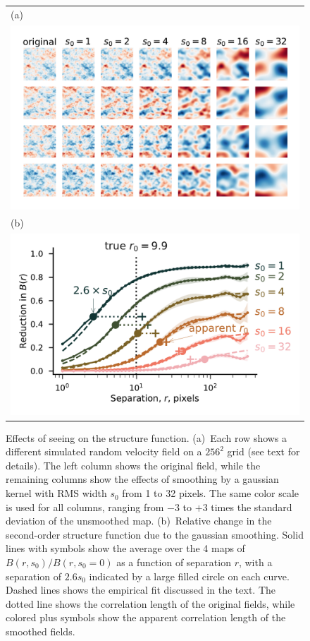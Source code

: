 \documentclass[fleqn,usenatbib, useAMS, a4paper]{mnras}
\newcommand\startNEW{\color{black}}
\newcommand\stopNEW{\color{black}}
\newcommand\NEW[1]{\startNEW #1\stopNEW\relax}
\begin{document}
\begin{figure}
  \begin{tabular}{@{} l @{}}
    (a)\\
    \includegraphics[width=\linewidth]{Figures/fake-3d-seeing-nonp-ems-fluct-thumbnails_sigE_1}\\
    (b)\\
    \includegraphics[width=\linewidth]{Figures/fake-seeing-nonp-3d-ems-fluc_m4-reduction_sigE_1}
  \end{tabular}
  \caption{Effects of seeing on the structure function.
    (a)~Each row shows a different simulated random velocity field
    on a \(256^2\) grid (see text for details).
    The left column shows the original field,
    while the remaining columns show the effects of smoothing by a gaussian kernel
    with RMS width \(s_0\) from 1 to 32 pixels.
    The same color scale is used for all columns, ranging from \(-3\) to \(+3\) times
    the standard deviation of the unsmoothed map.
    (b)~Relative change in the second-order structure function due to the gaussian smoothing.
    Solid lines with symbols show the average over the 4 maps of
    \(B(r, s_0) / B(r, s_0 = 0)\) as a function of separation \(r\),
    with a separation of \NEW{\(2.6 s_0\)} indicated by a large filled circle on each curve.
    Dashed lines shows the empirical fit discussed in the text.
    The dotted line shows the correlation length of the original fields,
    while colored plus symbols show the apparent correlation length of the smoothed fields.
  }
  \label{fig:seeing-reduction}
\end{figure}
\end{document}
